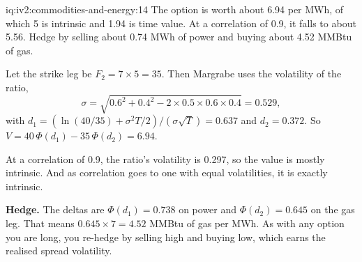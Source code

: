 \begin{solution}{iq:iv2:commodities-and-energy:14}
The option is worth about 6.94 per MWh, of which 5 is intrinsic and 1.94 is time value. At a correlation of 0.9, it falls to about 5.56. Hedge by selling about 0.74 MWh of power and buying about 4.52 MMBtu of gas.

Let the strike leg be $F_2 = 7 \times 5 = 35$. Then Margrabe uses the volatility of the ratio,
\[
\sigma = \sqrt{0.6^2 + 0.4^2 - 2 \times 0.5 \times 0.6 \times 0.4} = 0.529,
\]
with $d_1 = (\ln(40/35) + \sigma^2 T/2)/(\sigma\sqrt{T}) = 0.637$ and $d_2 = 0.372$. So $V = 40\,\Phi(d_1) - 35\,\Phi(d_2) = 6.94$.

At a correlation of 0.9, the ratio's volatility is 0.297, so the value is mostly intrinsic. And as correlation goes to one with equal volatilities, it is exactly intrinsic.

\textbf{Hedge.} The deltas are $\Phi(d_1) = 0.738$ on power and $\Phi(d_2) = 0.645$ on the gas leg. That means $0.645 \times 7 = 4.52$ MMBtu of gas per MWh. As with any option you are long, you re-hedge by selling high and buying low, which earns the realised spread volatility.

\end{solution}


